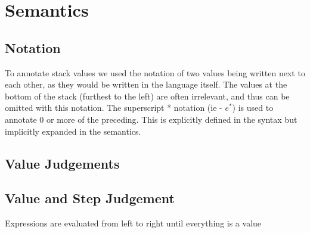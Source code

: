 \documentclass{article}
\begin{document}
\section{Semantics}
\subsection{Notation}
To annotate stack values we used the notation of two values being written next to each other, as they would be written in the language itself. The values at the bottom of the stack (furthest to the left) are often irrelevant, and thus can be omitted with this notation. The superscript * notation (ie - $e^*$) is used to annotate 0 or more of the preceding. This is explicitly defined in the syntax but implicitly expanded in the semantics.

\subsection{Value Judgements}
{
    \centering
    \def \MathparLineskip {\lineskip=0.43cm}
    \begin{mathpar}
        
    \end{mathpar}
}

\subsection{Value and Step Judgement}
Expressions are evaluated from left to right until everything is a value
{
    \centering
    \def \MathparLineskip {\lineskip=0.43cm}
}
\end{document}
